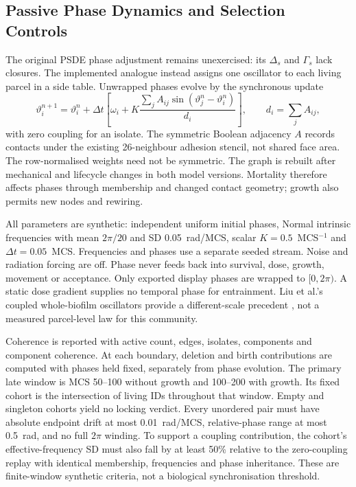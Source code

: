 \documentclass[11pt]{article}
\begin{document}
\subsection{Passive Phase Dynamics and Selection Controls}
\label{app:phase_passenger}

The original PSDE phase adjustment remains unexercised: its $\Delta_s$ and $\Gamma_s$
lack closures. The implemented analogue instead assigns one oscillator to each living
parcel in a side table. Unwrapped phases evolve by the synchronous update
\begin{equation}
 \vartheta_i^{n+1}=\vartheta_i^n+\Delta t\left[
 \omega_i+K\frac{\sum_j A_{ij}\sin(\vartheta_j^n-\vartheta_i^n)}{d_i}\right],
 \qquad d_i=\sum_j A_{ij},
 \label{eq:phase_passenger}
\end{equation}
with zero coupling for an isolate. The symmetric Boolean adjacency $A$ records contacts
under the existing 26-neighbour adhesion stencil, not shared face area. The row-normalised
weights need not be symmetric. The graph is rebuilt after mechanical and lifecycle
changes in both model versions. Mortality therefore affects phases through membership
and changed contact geometry; growth also permits new nodes and rewiring.

All parameters are synthetic: independent uniform initial phases, Normal intrinsic
frequencies with mean $2\pi/20$ and SD 0.05~rad/MCS, scalar $K=0.5$~MCS$^{-1}$ and
$\Delta t=0.05$~MCS. Frequencies and phases use a separate seeded stream. Noise and
radiation forcing are off. Phase never feeds back into survival, dose, growth, movement
or acceptance. Only exported display phases are wrapped to $[0,2\pi)$.
A static dose gradient supplies no temporal phase for entrainment.
Liu et al.'s coupled whole-biofilm oscillators provide a different-scale precedent
\cite{liu2017biofilm}, not a measured parcel-level law for this community.

Coherence is reported with active count, edges, isolates, components and component
coherence. At each boundary, deletion and birth contributions are computed with phases
held fixed, separately from phase evolution. The primary late window is MCS 50--100
without growth and 100--200 with growth. Its fixed cohort is the intersection of living
IDs throughout that window. Empty and singleton cohorts yield no locking verdict.
Every unordered pair must have absolute endpoint drift at most 0.01~rad/MCS, relative-phase
range at most 0.5~rad, and no full $2\pi$ winding. To support a coupling contribution,
the cohort's effective-frequency SD must also fall by at least 50\% relative to the
zero-coupling replay with identical membership, frequencies and phase inheritance.
These are finite-window synthetic criteria, not a biological synchronisation threshold.
\end{document}
